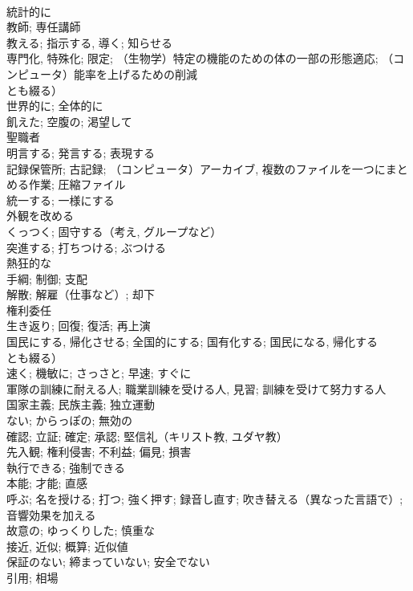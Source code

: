 \documentclass[8pt]{extreport}
\begin{document}
\begin{CJK}{UTF8}{min}
\\	統計的に	
\\	教師; 専任講師	
\\	教える; 指示する, 導く; 知らせる	
\\	専門化, 特殊化; 限定; （生物学）特定の機能のための体の一部の形態適応; （コンピュータ）能率を上げるための削減
\\	とも綴る）	
\\	世界的に; 全体的に	
\\	飢えた; 空腹の; 渇望して	
\\	聖職者	
\\	明言する; 発言する; 表現する	
\\	記録保管所; 古記録; （コンピュータ）アーカイブ, 複数のファイルを一つにまとめる作業; 圧縮ファイル	
\\	統一する; 一様にする	
\\	外観を改める	
\\	くっつく; 固守する（考え, グループなど）	
\\	突進する; 打ちつける; ぶつける	
\\	熱狂的な	
\\	手綱; 制御; 支配	
\\	解散; 解雇（仕事など）; 却下	
\\	権利委任	
\\	生き返り; 回復; 復活; 再上演	
\\	国民にする, 帰化させる; 全国的にする; 国有化する; 国民になる, 帰化する
\\	とも綴る）	
\\	速く; 機敏に; さっさと; 早速; すぐに	
\\	軍隊の訓練に耐える人; 職業訓練を受ける人, 見習; 訓練を受けて努力する人	
\\	国家主義; 民族主義; 独立運動	
\\	ない; からっぽの; 無効の	
\\	確認; 立証; 確定; 承認; 堅信礼（キリスト教, ユダヤ教）	
\\	先入観; 権利侵害; 不利益; 偏見; 損害	
\\	執行できる; 強制できる	
\\	本能; 才能; 直感	
\\	呼ぶ; 名を授ける; 打つ; 強く押す; 録音し直す; 吹き替える（異なった言語で）; 音響効果を加える	
\\	故意の; ゆっくりした; 慎重な	
\\	接近, 近似; 概算; 近似値	
\\	保証のない; 締まっていない; 安全でない	
\\	引用; 相場	

\end{CJK}
\end{document}
